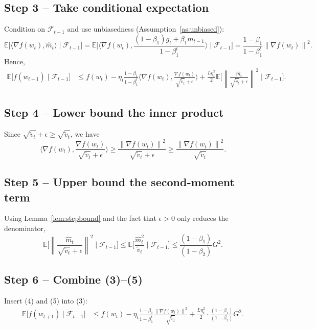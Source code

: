 \documentclass[11pt]{article}
\newcommand{\E}{\mathbb{E}}
\newcommand{\norm}[1]{\left\lVert #1\right\rVert}
\newcommand{\ip}[2]{\langle #1,#2\rangle}
\begin{document}
\subsection*{Step 3 – Take conditional expectation}
Condition on $\mathcal{F}_{t-1}$ and use unbiasedness (Assumption~\ref{as:unbiased}):
\[
\E\!\big[\ip{\nabla f(w_{t})}{\hat m_{t}} \mid \mathcal{F}_{t-1}\big]
   = \E\!\big[\ip{\nabla f(w_{t})}{\frac{(1-\beta_{1})g_{t}+ \beta_{1}m_{t-1}}{1-\beta_{1}^{t}}}\mid \mathcal{F}_{t-1}\big]
   = \frac{1-\beta_{1}}{1-\beta_{1}^{t}}\norm{\nabla f(w_{t})}^{2} .
\]
Hence,
\begin{align}
\E\!\big[f(w_{t+1})\mid\mathcal{F}_{t-1}\big]
   &\le f(w_{t}) - \eta_{t}\frac{1-\beta_{1}}{1-\beta_{1}^{t}}
        \ip{\nabla f(w_{t})}{\frac{\nabla f(w_{t})}{\sqrt{\tilde v_{t}}+\epsilon}}
        + \frac{L\eta_{t}^{2}}{2}\E\!\big[\norm{\frac{\hat m_{t}}{\sqrt{\tilde v_{t}}+\epsilon}}^{2}\mid\mathcal{F}_{t-1}\big]. \tag{3}
\end{align}
\subsection*{Step 4 – Lower bound the inner product}
Since $\sqrt{\tilde v_{t}}+\epsilon\ge \sqrt{\tilde v_{t}}$, we have
\[
\ip{\nabla f(w_{t})}{\frac{\nabla f(w_{t})}{\sqrt{\tilde v_{t}}+\epsilon}}
   \ge \frac{\norm{\nabla f(w_{t})}^{2}}{\sqrt{\tilde v_{t}}+\epsilon}
   \ge \frac{\norm{\nabla f(w_{t})}^{2}}{\sqrt{\tilde v_{t}}}.
\tag{4}
\]
\subsection*{Step 5 – Upper bound the second‑moment term}
Using Lemma~\ref{lem:stepbound} and the fact that $\epsilon>0$ only reduces the denominator,
\[
\E\!\big[\norm{\frac{\hat m_{t}}{\sqrt{\tilde v_{t}}+\epsilon}}^{2}\mid\mathcal{F}_{t-1}\big]
   \le \E\!\big[\frac{\hat m_{t}^{2}}{\tilde v_{t}}\mid\mathcal{F}_{t-1}\big]
   \le \frac{(1-\beta_{1})}{(1-\beta_{2})} G^{2}.
\tag{5}
\]
\subsection*{Step 6 – Combine (3)–(5)}
Insert (4) and (5) into (3):
\begin{align}
\E\!\big[f(w_{t+1})\mid\mathcal{F}_{t-1}\big]
   &\le f(w_{t})
      - \eta_{t}\frac{1-\beta_{1}}{1-\beta_{1}^{t}}
        \frac{\norm{\nabla f(w_{t})}^{2}}{\sqrt{\tilde v_{t}}}
      + \frac{L\eta_{t}^{2}}{2}\cdot\frac{(1-\beta_{1})}{(1-\beta_{2})} G^{2}.
\tag{6}
\end{align}
\end{document}
